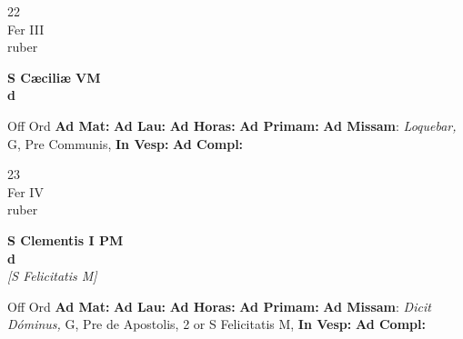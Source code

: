\documentclass[10pt, openany]{book}
\begin{document}
        \begin{center}
            \begin{minipage}{3.5in}
                \vspace{2em}
                \begin{minipage}{0.5in}
                    {\Huge 22} \\
                    {\normalsize Fer III} \\
                    {\normalsize ruber}
                \end{minipage}
                \begin{minipage}{3.0in}
                    \textbf{ \large S Cæciliæ VM \\
                    \textnormal{\normalsize d}} \\ 
                \end{minipage}
                \begin{justify}Off Ord
                    \textbf{Ad Mat: }
                    \textbf{Ad Lau: }
                    \textbf{Ad Horas: }
                    \textbf{Ad Primam: }\textbf{Ad Missam}: \textit{Loquebar,} G, Pre Communis,  
                    \textbf{In Vesp: }
                    \textbf{Ad Compl: }
                \end{justify}
            \end{minipage}
        \end{center}
    
        \begin{center}
            \begin{minipage}{3.5in}
                \vspace{2em}
                \begin{minipage}{0.5in}
                    {\Huge 23} \\
                    {\normalsize Fer IV} \\
                    {\normalsize ruber}
                \end{minipage}
                \begin{minipage}{3.0in}
                    \textbf{ \large S Clementis I PM \\
                    \textnormal{\normalsize d}} \\ \textit{[S Felicitatis M]} \\ 
                \end{minipage}
                \begin{justify}Off Ord
                    \textbf{Ad Mat: }
                    \textbf{Ad Lau: }
                    \textbf{Ad Horas: }
                    \textbf{Ad Primam: }\textbf{Ad Missam}: \textit{Dicit Dóminus,} G, Pre de Apostolis, 2 or S Felicitatis M,  
                    \textbf{In Vesp: }
                    \textbf{Ad Compl: }
                \end{justify}
            \end{minipage}
        \end{center}
    
\end{document}
